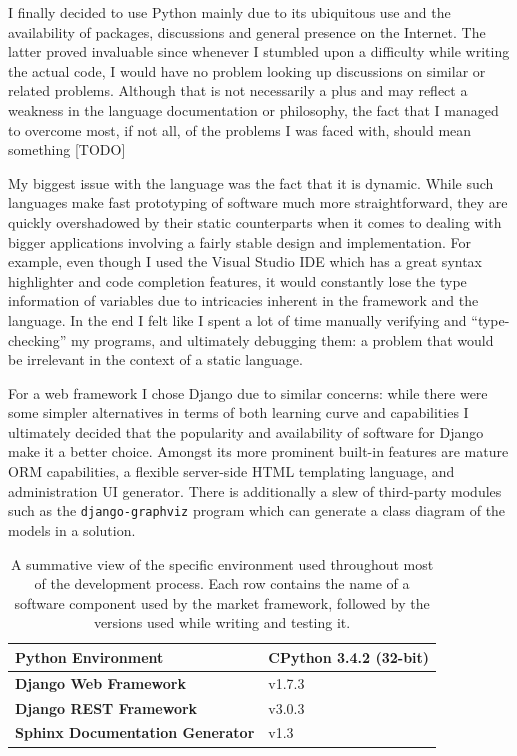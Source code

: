 \documentclass[bsc,frontabs,twoside,singlespacing,parskip,deptreport]{infthesis}     %
\begin{document}
    I finally decided to use Python mainly due to its ubiquitous use and the availability of packages, discussions and general presence on the Internet. The latter proved invaluable since whenever I stumbled upon a difficulty while writing the actual code, I would have no problem looking up discussions on similar or related problems. Although that is not necessarily a plus and may reflect a weakness in the language documentation or philosophy, the fact that I managed to overcome most, if not all, of the problems I was faced with, should mean something [TODO]

    My biggest issue with the language was the fact that it is dynamic. While such languages make fast prototyping of software much more straightforward, they are quickly overshadowed by their static counterparts when it comes to dealing with bigger applications involving a fairly stable design and implementation. For example, even though I used the Visual Studio IDE which has a great syntax highlighter and code completion features, it would constantly lose the type information of variables due to intricacies inherent in the framework and the language. In the end I felt like I spent a lot of time manually verifying and ``type-checking'' my programs, and ultimately debugging them: a problem that would be irrelevant in the context of a static language.
    
    For a web framework I chose Django due to similar concerns: while there were some simpler alternatives in terms of both learning curve and capabilities I ultimately decided that the popularity and availability of software for Django make it a better choice. Amongst its more prominent built-in features are mature ORM capabilities, a flexible server-side HTML templating language, and administration UI generator. There is additionally a slew of third-party modules such as the {\tt django-graphviz} program which can generate a class diagram of the models in a solution.

\begin{table}[h]
\centering
\begin{tabular}{|l|l|}
\hline
\textbf{Python Environment}    & CPython 3.4.2 (32-bit)           \\ \hline
\textbf{Django Web Framework}  & v1.7.3                           \\ \hline
\textbf{Django REST Framework} & v3.0.3                           \\ \hline
\textbf{Sphinx Documentation Generator}                & v1.3                             \\ \hline
\end{tabular}
\caption{A summative view of the specific environment used throughout most of the development process. Each row contains the name of a software component used by the market framework, followed by the versions used while writing and testing it. }
\label{tab:dev-env}
\end{table}
\end{document}
